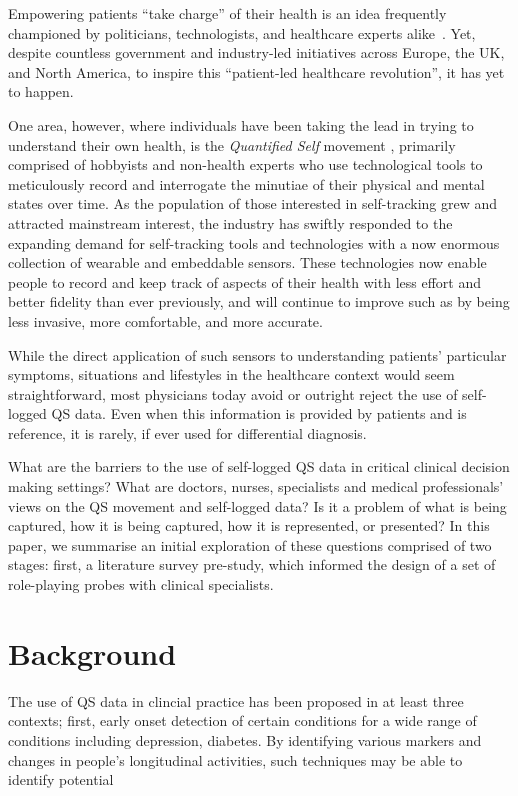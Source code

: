 \documentclass{sigchi}
\begin{document}
Empowering patients ``take charge'' of their health is an idea frequently championed by politicians, technologists, and healthcare experts alike~\cite{swan2012health}.  Yet, despite countless government and industry-led initiatives across Europe, the UK, and North America, to inspire this ``patient-led healthcare revolution'', it has yet to happen.  

One area, however, where individuals have been taking the lead in trying to understand their own health, is the \emph{Quantified Self} movement \cite{}, primarily comprised of hobbyists and non-health experts who use technological tools to meticulously record and interrogate the minutiae of their physical and mental states over time.   As the population of those interested in self-tracking grew and attracted mainstream interest, the industry has swiftly responded to the expanding demand for self-tracking tools and technologies with a now enormous collection of wearable and embeddable sensors.  These technologies now enable people to record and keep track of aspects of their health with less effort and better fidelity than ever previously, and will continue to improve such as by being less invasive, more comfortable, and more accurate.

While the direct application of such sensors to understanding patients' particular symptoms, situations and lifestyles in the healthcare context would seem straightforward, most physicians today avoid or outright reject the use of self-logged QS data. Even when this information is provided by patients and is reference, it is rarely, if ever used for differential diagnosis.  

What are the barriers to the use of self-logged QS data in critical clinical decision making settings?  What are doctors, nurses, specialists and medical professionals' views on the QS movement and self-logged data?  Is it a problem of what is being captured, how it is being captured, how it is represented, or presented?  In this paper, we summarise an initial exploration of these questions comprised of two stages: first, a literature survey pre-study, which informed the design of a set of role-playing probes with clinical specialists.

\section{Background} 

The use of QS data in clincial practice has been proposed in at least three contexts; first, early onset detection of certain conditions for a wide range of conditions including depression, diabetes. By identifying various markers and changes in people's longitudinal activities, such techniques may be able to identify potential 
\end{document}
